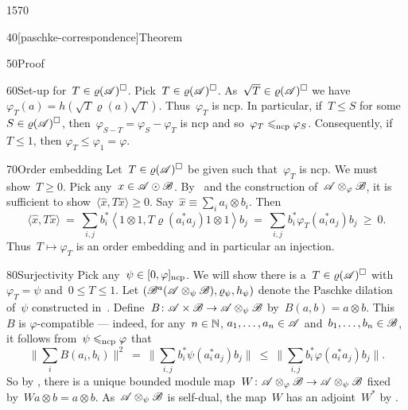 \begin{parsec}{1570}
\begin{point}{40}[paschke-correspondence]{Theorem}
\begin{point}{50}{Proof}
\begin{point}{60}{Set-up}
    for~$T \in \varrho(\mathscr{A})^\square$.
Pick~$T \in \varrho(\mathscr{A})^\square$.
As~$\sqrt{T} \in \varrho(\mathscr{A})^\square$
    we have~$\varphi_T(a) = h(\sqrt{T} \varrho(a)\sqrt{T})$.
    Thus~$\varphi_T$ is ncp.
In particular, if~$T \leq S$
    for some~$S \in \varrho(\mathscr{A})^\square$,
    then~$\varphi_{S-T} = \varphi_S - \varphi_T$ is ncp
    and so~$\varphi_T \mathrel{\leqslant_{\mathrm{ncp}}} \varphi_S$.
Consequently, if~$T\leq 1$, then $\varphi_T \leq \varphi_1 = \varphi$.
\end{point}
\begin{point}{70}{Order embedding}%
Let~$T \in \varrho(\mathscr{A})^\square$
    be given such that~$\varphi_T$ is ncp.
We must show~$T \geq 0$.
Pick any~$x \in \mathscr{A} \odot \mathscr{B}$.
By~ and
    the construction of~$\mathscr{A} \otimes_\varphi \mathscr{B}$,
    it is sufficient to show~$\langle \hat{x}, T \hat{x}\rangle \geq 0$.
Say~$\hat{x} \equiv \sum_i a_i \otimes b_i$.
Then
\begin{equation*}
    \langle\hat{x}, T \hat{x} \rangle
    \ =\  \sum_{i,j} b_i^* \left< 1\otimes 1, T \varrho(a_i^*a_j) 1 \otimes 1\right> b_j
    \ = \ \sum_{i,j} b_i^* \varphi_T (a_i^*a_j) b_j \ \geq\  0.
\end{equation*}
Thus~$T \mapsto \varphi_T$ is an order embedding
    and in particular an injection.
\end{point}
\begin{point}{80}{Surjectivity}%
Pick any~$\psi \in [0,\varphi]_{\mathrm{ncp}}$.
We will show there is a~$T \in \varrho(\mathscr{A})^\square$
    with~$\varphi_T = \psi$ and~$0 \leq T \leq 1$.
Let $(\mathscr{B}^a(\mathscr{A} \otimes_\psi \mathscr{B}),
    \varrho_\psi, h_\psi)$ denote the Paschke dilation of~$\psi$
    constructed in~.
Define~$B\colon \mathscr{A} \times \mathscr{B} \to \mathscr{A} \otimes_\psi \mathscr{B}$
    by~$B(a,b) = a \otimes b$.
This~$B$ is $\varphi$-compatible
--- indeed, for any~$n \in \mathbb{N}$, $a_1, \ldots, a_n \in \mathscr{A}$
    and~$b_1, \ldots, b_n \in \mathscr{B}$,
    it follows from~$\psi \mathrel{\leqslant_{\mathrm{ncp}}} \varphi$ that
\begin{equation*}
    \bigl\| \sum_i B(a_i, b_i) \bigr\|^2
     \ = \  \bigl\| \sum_{i,j}
                b_i^* \psi(a_i^*a_j) b_j \bigr\|
     \ \leq \  \bigl\| \sum_{i,j}
                b_i^* \varphi(a_i^*a_j) b_j \bigr\|.
\end{equation*}
So by ,
    there is a unique bounded module
    map~$W \colon \mathscr{A} \otimes_\varphi \mathscr{B} \to \mathscr{A} \otimes_\psi \mathscr{B}$
    fixed by~$W a \otimes b = a \otimes b$.
As~$\mathscr{A} \otimes_\psi \mathscr{B}$ is self-dual,
    the map~$W$ has an adjoint~$W^*$ by .

\end{point}
\end{point}
\end{point}
\end{parsec}
